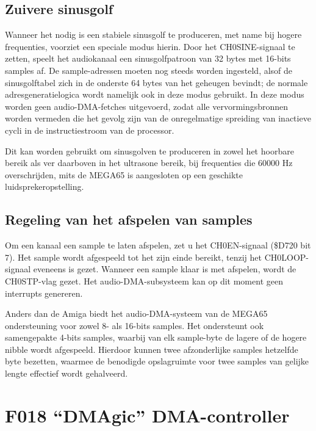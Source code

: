 \subsection{Zuivere sinusgolf}

Wanneer het nodig is een stabiele sinusgolf te produceren, met name bij hogere frequenties, voorziet een speciale modus hierin. Door het CH0SINE-signaal te zetten, speelt het audiokanaal een sinusgolfpatroon van 32 bytes met 16-bits samples af. De sample-adressen moeten nog steeds worden ingesteld, alsof de sinusgolftabel zich in de onderste 64 bytes van het geheugen bevindt; de normale adresgeneratielogica wordt namelijk ook in deze modus gebruikt. In deze modus worden geen audio-DMA-fetches uitgevoerd, zodat alle vervormingsbronnen worden vermeden die het gevolg zijn van de onregelmatige spreiding van inactieve cycli in de instructiestroom van de processor.

Dit kan worden gebruikt om sinusgolven te produceren in zowel het hoorbare bereik als ver daarboven in het ultrasone bereik, bij frequenties die 60000 Hz overschrijden, mits de MEGA65 is aangesloten op een geschikte luidsprekeropstelling.

\subsection{Regeling van het afspelen van samples}

Om een kanaal een sample te laten afspelen, zet u het CH0EN-signaal (\$D720 bit 7). Het sample wordt afgespeeld tot het zijn einde bereikt, tenzij het CH0LOOP-signaal eveneens is gezet. Wanneer een sample klaar is met afspelen, wordt de CH0STP-vlag gezet. Het audio-DMA-subsysteem kan op dit moment geen interrupts genereren.

Anders dan de Amiga\texttrademark{} biedt het audio-DMA-systeem van de MEGA65 ondersteuning voor zowel 8- als 16-bits samples. Het ondersteunt ook samengepakte 4-bits samples, waarbij van elk sample-byte de lagere of de hogere nibble wordt afgespeeld. Hierdoor kunnen twee afzonderlijke samples hetzelfde byte bezetten, waarmee de benodigde opslagruimte voor twee samples van gelijke lengte effectief wordt gehalveerd.

\section{F018 ``DMAgic'' DMA-controller}



